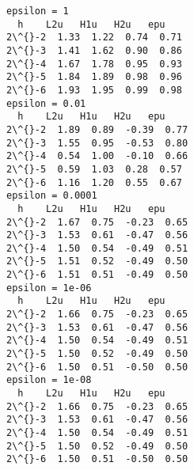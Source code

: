 \documentclass[11pt]{article}
\begin{document}
    \begin{Verbatim}[commandchars=\\\{\}]
epsilon = 1
  h    L2u   H1u   H2u   epu
2\^{}-2  1.33  1.22  0.74  0.71
2\^{}-3  1.41  1.62  0.90  0.86
2\^{}-4  1.67  1.78  0.95  0.93
2\^{}-5  1.84  1.89  0.98  0.96
2\^{}-6  1.93  1.95  0.99  0.98
epsilon = 0.01
  h    L2u   H1u   H2u   epu
2\^{}-2  1.89  0.89  -0.39  0.77
2\^{}-3  1.55  0.95  -0.53  0.80
2\^{}-4  0.54  1.00  -0.10  0.66
2\^{}-5  0.59  1.03  0.28  0.57
2\^{}-6  1.16  1.20  0.55  0.67
epsilon = 0.0001
  h    L2u   H1u   H2u   epu
2\^{}-2  1.67  0.75  -0.23  0.65
2\^{}-3  1.53  0.61  -0.47  0.56
2\^{}-4  1.50  0.54  -0.49  0.51
2\^{}-5  1.51  0.52  -0.49  0.50
2\^{}-6  1.51  0.51  -0.49  0.50
epsilon = 1e-06
  h    L2u   H1u   H2u   epu
2\^{}-2  1.66  0.75  -0.23  0.65
2\^{}-3  1.53  0.61  -0.47  0.56
2\^{}-4  1.50  0.54  -0.49  0.51
2\^{}-5  1.50  0.52  -0.49  0.50
2\^{}-6  1.50  0.51  -0.50  0.50
epsilon = 1e-08
  h    L2u   H1u   H2u   epu
2\^{}-2  1.66  0.75  -0.23  0.65
2\^{}-3  1.53  0.61  -0.47  0.56
2\^{}-4  1.50  0.54  -0.49  0.51
2\^{}-5  1.50  0.52  -0.49  0.50
2\^{}-6  1.50  0.51  -0.50  0.50
    \end{Verbatim}


    
    
    
\end{document}
